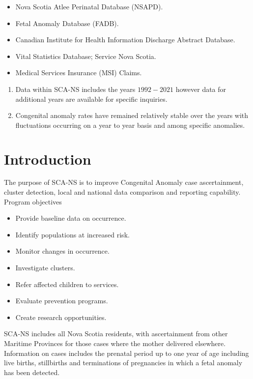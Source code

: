\documentclass[
]{krantz}
\providecommand{\tightlist}{%
  \setlength{\itemsep}{0pt}\setlength{\parskip}{0pt}}
\begin{document}
\begin{itemize}
\tightlist
\item
  Nova Scotia Atlee Perinatal Database (NSAPD).
\item
  Fetal Anomaly Database (FADB).
\item
  Canadian Institute for Health Information Discharge Abstract Database.
\item
  Vital Statistics Database; Service Nova Scotia.
\item
  Medical Services Insurance (MSI) Claims.
\end{itemize}

\begin{enumerate}
\def\labelenumi{\arabic{enumi}.}
\setcounter{enumi}{5}
\item
  Data within SCA-NS includes the years \(1992-2021\) however data for additional years are available for specific inquiries.
\item
  Congenital anomaly rates have remained relatively stable over the years with fluctuations occurring on a year to year basis and among specific anomalies.
\end{enumerate}

\hypertarget{introduction}{%
\chapter*{Introduction}\label{introduction}}


The purpose of SCA-NS is to improve Congenital Anomaly case ascertainment, cluster detection, local and national data comparison and reporting capability. Program objectives

\begin{itemize}
\tightlist
\item
  Provide baseline data on occurrence.
\item
  Identify populations at increased risk.
\item
  Monitor changes in occurrence.
\item
  Investigate clusters.
\item
  Refer affected children to services.
\item
  Evaluate prevention programs.
\item
  Create research opportunities.
\end{itemize}

SCA-NS includes all Nova Scotia residents, with ascertainment from other Maritime Provinces for those cases where the mother delivered elsewhere. Information on cases includes the prenatal period up to one year of age including live births, stillbirths and terminations of pregnancies in which a fetal anomaly has been detected.
\end{document}
